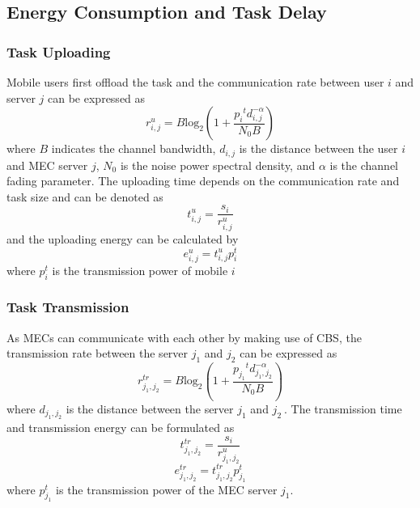 \documentclass[conference]{IEEEtran}
\begin{document}
\subsection{Energy Consumption and Task Delay}

\subsubsection{Task Uploading}
Mobile users first offload the task and the communication rate between user $i$ and server $j$ can be expressed as
\begin{equation} \label{c_rate}
r^u_{i,j}=B{{\mathrm{log}}_2 \left(1+\frac{{p_i}^td^{-\alpha }_{i,j}}{N_0B}\right) } 
\end{equation}
where $B$ indicates the channel bandwidth, $d_{i,j}$ is the distance between the user $i$ and MEC server $j$, $N_0$ is the noise power spectral density, and $\alpha $ is the channel fading parameter. The uploading time depends on the communication rate and task size and can be denoted as
\begin{equation} \label{t_upload}
t^u_{i,j}=\frac{s_i}{r^u_{i,j}} 
\end{equation}
and the uploading energy can be calculated by
\begin{equation} \label{e_upload}
e^u_{i,j}=t^u_{i,j}p^t_i
\end{equation}
where $p^t_i$ is the transmission power of mobile $i$ \\


\subsubsection{Task Transmission}
As MECs can communicate with each other by making use of CBS, the transmission rate between the server $j_1$ and $j_2$ can be expressed as 
\begin{equation} \label{t_rate}
r^{tr}_{j_1,j_2}=B{{\mathrm{log}}_2\left(1+\frac{{p^{\ }_{j_1}}^td^{-\alpha }_{j_1,j_2}}{N_0B}\right)}
\end{equation}
where $d_{j_1,j_2}$ is the distance between the server $j_1$ and ${j_2}_{\ }$. The transmission time and transmission energy can be formulated as
\begin{equation} \label{t_trans}
t^{tr}_{j_1,j_2}=\frac{s_i}{r^u_{j_1,j_2}}
\end{equation}
\begin{equation} \label{e_trans}
e^{tr}_{j_1,j_2}{=t}^{tr}_{j_1,j_2}p^t_{j_1}
\end{equation}
where $p^t_{j_1}$ is the transmission power of the MEC server $j_1$.\\
\end{document}
